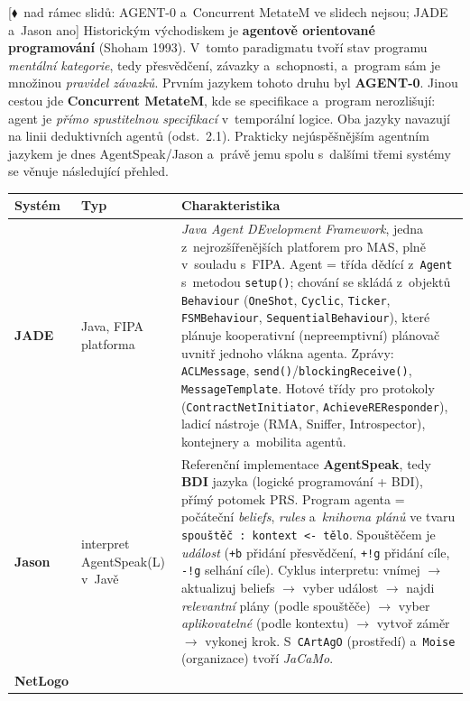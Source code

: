 \documentclass[11pt,a4paper]{article}
\theoremstyle{definition}
\newcommand{\mimoq}[1]{\textcolor{markcol}{\textsf{\footnotesize[$\blacklozenge$~nad rámec slidů: #1]}}}
\begin{document}
\noindent\mimoq{AGENT-0 a~Concurrent MetateM ve slidech nejsou; JADE a~Jason ano}
Historickým východiskem je \textbf{agentově orientované programování} (Shoham 1993).
V~tomto paradigmatu tvoří stav programu \emph{mentální kategorie}, tedy přesvědčení, závazky
a~schopnosti, a~program sám je množinou \emph{pravidel závazků}. Prvním jazykem tohoto druhu
byl \textbf{AGENT-0}. Jinou cestou jde \textbf{Concurrent MetateM}, kde se specifikace
a~program nerozlišují: agent je \emph{přímo spustitelnou specifikací} v~temporální logice.
Oba jazyky navazují na linii deduktivních agentů (odst.\ 2.1). Prakticky nejúspěšnějším
agentním jazykem je dnes AgentSpeak/Jason a~právě jemu spolu s~dalšími třemi systémy se
věnuje následující přehled.
\begin{center}\small
\begin{tabular}{p{} p{} p{}}
\toprule
\textbf{Systém} & \textbf{Typ} & \textbf{Charakteristika} \\
\midrule
\textbf{JADE}
  & Java, FIPA platforma
  & \emph{Java Agent DEvelopment Framework}, jedna z~nejrozšířenějších platforem pro MAS, plně
    v~souladu s~FIPA. Agent = třída dědící z~\texttt{Agent} s~metodou \texttt{setup()};
    chování se skládá z~objektů \texttt{Behaviour} (\texttt{OneShot}, \texttt{Cyclic},
    \texttt{Ticker}, \texttt{FSMBehaviour}, \texttt{SequentialBehaviour}), které plánuje
    kooperativní (nepreemptivní) plánovač uvnitř jednoho vlákna agenta. Zprávy:
    \texttt{ACLMessage}, \texttt{send()}/\texttt{blockingReceive()}, \texttt{MessageTemplate}.
    Hotové třídy pro protokoly (\texttt{ContractNetInitiator}, \texttt{AchieveREResponder}),
    ladicí nástroje (RMA, Sniffer, Introspector), kontejnery a~mobilita agentů. \\
\textbf{Jason}
  & interpret AgentSpeak(L) v~Javě
  & Referenční implementace \textbf{AgentSpeak}, tedy \textbf{BDI} jazyka (logické programování
    + BDI), přímý potomek PRS. Program agenta = počáteční \emph{beliefs}, \emph{rules}
    a~\emph{knihovna plánů} ve tvaru \texttt{spouštěč : kontext <- tělo}. Spouštěčem je
    \emph{událost} (\texttt{+b} přidání přesvědčení, \texttt{+!g} přidání cíle, \texttt{-!g}
    selhání cíle). Cyklus interpretu: vnímej $\to$ aktualizuj beliefs $\to$ vyber událost $\to$
    najdi \emph{relevantní} plány (podle spouštěče) $\to$ vyber \emph{aplikovatelné}
    (podle kontextu) $\to$ vytvoř záměr $\to$ vykonej krok. S~\texttt{CArtAgO} (prostředí)
    a~\texttt{Moise} (organizace) tvoří \emph{JaCaMo}. \\
\textbf{NetLogo}

\end{tabular}
\end{center}
\end{document}
